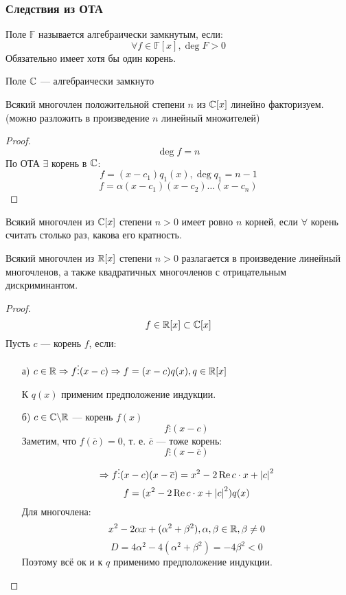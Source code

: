 \subsubsection{Следствия из ОТА}
\begin{definition}
Поле $\mathbb{F}$ называется алгебраически замкнутым, если:
\[
  \forall f \in \mathbb{F}[x], \deg F > 0
\]
Обязательно имеет хотя бы один корень.
\end{definition}
\begin{consequence}
  \label{consequence:02_OTA_1}
  Поле $\mathbb{C}$ --- алгебраически замкнуто
\end{consequence}
\begin{consequence}
  \label{consequence:02_OTA_2}
  Всякий многочлен положительной степени $n$ из $\mathbb{C}[x]$ линейно факторизуем. (можно разложить в произведение $n$ линейный множителей)
\end{consequence}
\begin{proof}
  \[
  \deg f = n
  \]
  По ОТА $\exists$ корень в $\mathbb{C}$:
  \[
  f = (x - c_1) q_1(x), \deg q_1 = n - 1
  \]
  \[
  f = \alpha(x - c_1)(x - c_2) \ldots (x - c_n)
  \]
\end{proof}
\begin{consequence}
  \label{consequence:02_OTA_3}
  Всякий многочлен из $\mathbb{C}[x]$ степени $n > 0$ имеет ровно $n$ корней, если $\forall$ корень считать столько раз, какова его кратность.
\end{consequence}
\begin{consequence}
  \label{consequence:02_OTA_4}
  Всякий многочлен из $\mathbb{R}[x]$ степени $n > 0$ разлагается в произведение линейный многочленов, а также квадратичных многочленов с отрицательным дискриминантом.
\end{consequence}
\begin{proof}
  \[
  f  \in \mathbb{R}[x] \subset \mathbb{C}[x]
  \]
  Пусть $c$ --- корень $f$, если:
  \begin{itemize}
    \item [а) ] $c \in \mathbb{R} \Rightarrow f \vdots (x - c) \Rightarrow f = (x - c)q(x), q \in \mathbb{R}[x]$

      К $q(x)$ применим предположение индукции.
    \item [б) ] $c \in \mathbb{C} \backslash \mathbb{R}$ --- корень $f(x)$
      \[
      f \vdots (x - c)
      \]
      Заметим, что $f(\overline{c}) = 0$, т. е. $\overline{c}$ --- тоже корень:
      \[
      f \vdots (x - \overline{c})
      \]
      \[
      \Rightarrow f \vdots (x - c)(x - \overline{c}) = x^{2} - 2 \operatorname{Re} c \cdot x + \left|c\right|^{2}
      \]
      \[
      f = (x^{2} - 2 \operatorname{Re} c \cdot x + \left|c\right|^{2}) q(x)
      \]
      Для многочлена:
      \[
      x^{2} - 2\alpha x + (\alpha^{2} + \beta^{2}), \alpha, \beta \in \mathbb{R}, \beta \neq 0
      \]
      \[
      D = 4\alpha^{2} - 4(\alpha^{2} + \beta^{2}) = -4\beta^{2} < 0
      \]
      Поэтому всё ок и к $q$ применимо предположение индукции.
  \end{itemize}
\end{proof}
